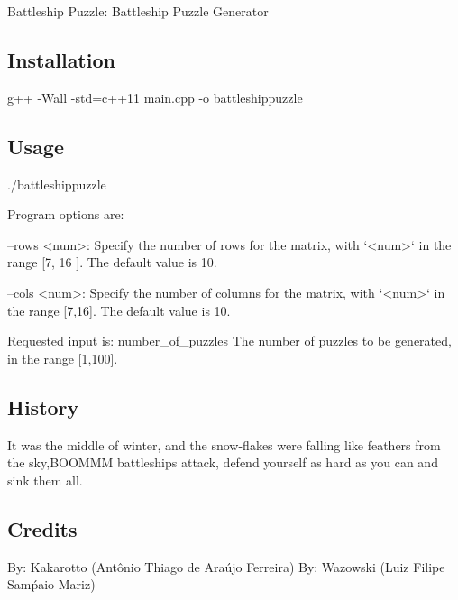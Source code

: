 Battleship Puzzle\+: Battleship Puzzle Generator

\subsection*{Installation}

g++ -\/\+Wall -\/std=c++11 main.\+cpp -\/o battleshippuzzle

\subsection*{Usage}

\begin{DoxyVerb}./battleshippuzzle

Program options are:

--rows <num>: Specify the number of rows for the matrix, with `<num>` in the range [7, 16 ]. The default
    value is 10.

--cols <num>: Specify the number of columns for the matrix, with `<num>` in the range [7,16]. The default value is 10.

    Requested input is:
    number_of_puzzles   The number of puzzles to be generated, in the range [1,100].
\end{DoxyVerb}


\subsection*{History}

\begin{DoxyVerb}    It was the middle of winter, and the snow-flakes were falling like feathers from the sky,BOOMMM battleships attack, defend yourself as hard as you can and sink them all.
\end{DoxyVerb}


\subsection*{Credits}

\begin{DoxyVerb}By: Kakarotto (Antônio Thiago de Araújo Ferreira)
By: Wazowski (Luiz Filipe Samṕaio Mariz) \end{DoxyVerb}
 